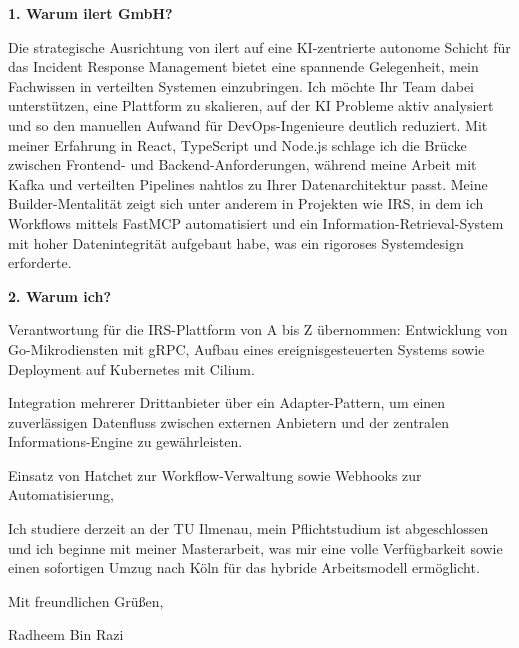 \documentclass[11pt,a4paper]{coverletter}
\begin{document}
\vspace{8pt}\noindent\textbf{1. Warum ilert GmbH?}\par\vspace{3pt}

Die strategische Ausrichtung von ilert auf eine KI-zentrierte autonome Schicht für das Incident Response Management bietet eine spannende Gelegenheit, mein Fachwissen in verteilten Systemen einzubringen. Ich möchte Ihr Team dabei unterstützen, eine Plattform zu skalieren, auf der KI Probleme aktiv analysiert und so den manuellen Aufwand für DevOps-Ingenieure deutlich reduziert. Mit meiner Erfahrung in React, TypeScript und Node.js schlage ich die Brücke zwischen Frontend- und Backend-Anforderungen, während meine Arbeit mit Kafka und verteilten Pipelines nahtlos zu Ihrer Datenarchitektur passt. Meine Builder-Mentalität zeigt sich unter anderem in Projekten wie IRS, in dem ich Workflows mittels FastMCP automatisiert und ein Information-Retrieval-System mit hoher Datenintegrität aufgebaut habe, was ein rigoroses Systemdesign erforderte.

\vspace{8pt}\noindent\textbf{2. Warum ich?}\par\vspace{3pt}

\bullets

  \item Verantwortung für die IRS-Plattform von A bis Z übernommen: Entwicklung von Go-Mikrodiensten mit gRPC, Aufbau eines ereignisgesteuerten Systems sowie Deployment auf Kubernetes mit Cilium.

  \item Integration mehrerer Drittanbieter über ein Adapter-Pattern, um einen zuverlässigen Datenfluss zwischen externen Anbietern und der zentralen Informations-Engine zu gewährleisten.

  \item Einsatz von Hatchet zur Workflow-Verwaltung sowie Webhooks zur Automatisierung,

\bulletsend

Ich studiere derzeit an der TU Ilmenau, mein Pflichtstudium ist abgeschlossen und ich beginne mit meiner Masterarbeit, was mir eine volle Verfügbarkeit sowie einen sofortigen Umzug nach Köln für das hybride Arbeitsmodell ermöglicht.

\closing{Mit freundlichen Grüßen,}{Radheem Bin Razi}
\end{document}

